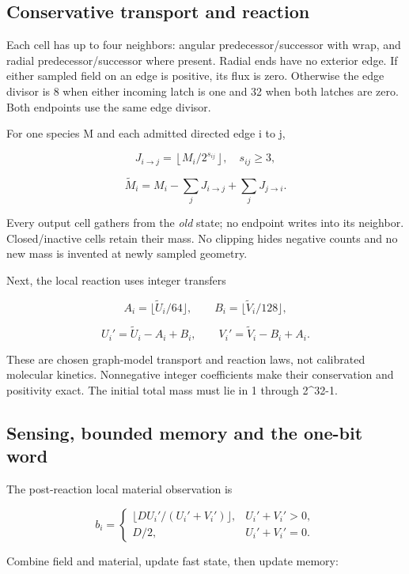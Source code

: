 \documentclass[11pt,a4paper]{article}
\begin{document}
\subsection{Conservative transport and reaction}\label{conservative-transport-and-reaction}

Each cell has up to four neighbors: angular predecessor/successor with wrap, and radial predecessor/successor where present. Radial ends have no exterior edge. If either sampled field on an edge is positive, its flux is zero. Otherwise the edge divisor is 8 when either incoming latch is one and 32 when both latches are zero. Both endpoints use the same edge divisor.

For one species M and each admitted directed edge i to j,

\[J_{i\to j}=\left\lfloor M_i/2^{s_{ij}}\right\rfloor,\quad s_{ij}\ge3,\]

\[\widetilde M_i=M_i-\sum_jJ_{i\to j}+\sum_jJ_{j\to i}.\]

Every output cell gathers from the \emph{old} state; no endpoint writes into its neighbor. Closed/inactive cells retain their mass. No clipping hides negative counts and no new mass is invented at newly sampled geometry.

Next, the local reaction uses integer transfers

\[A_i=\lfloor\widetilde U_i/64\rfloor,\qquad B_i=\lfloor\widetilde V_i/128\rfloor,\]

\[U_i'=\widetilde U_i-A_i+B_i,\qquad V_i'=\widetilde V_i-B_i+A_i.\]

These are chosen graph-model transport and reaction laws, not calibrated molecular kinetics. Nonnegative integer coefficients make their conservation and positivity exact. The initial total mass must lie in 1 through 2\^{}32-1.

\subsection{Sensing, bounded memory and the one-bit word}\label{sensing-bounded-memory-and-the-one-bit-word}

The post-reaction local material observation is

\[b_i=\begin{cases}\lfloor D U_i'/(U_i'+V_i')\rfloor,&U_i'+V_i'>0,\\D/2,&U_i'+V_i'=0.\end{cases}\]

Combine field and material, update fast state, then update memory:
\end{document}

